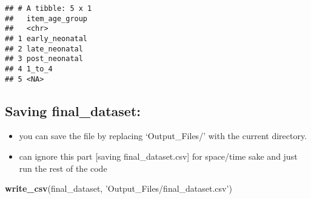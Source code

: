 \documentclass[]{article}
\newenvironment{Shaded}{\begin{snugshade}}{\end{snugshade}}
\newcommand{\DataTypeTok}[1]{\textcolor[rgb]{0.13,0.29,0.53}{#1}}
\newcommand{\DecValTok}[1]{\textcolor[rgb]{0.00,0.00,0.81}{#1}}
\newcommand{\KeywordTok}[1]{\textcolor[rgb]{0.13,0.29,0.53}{\textbf{#1}}}
\newcommand{\NormalTok}[1]{#1}
\newcommand{\OperatorTok}[1]{\textcolor[rgb]{0.81,0.36,0.00}{\textbf{#1}}}
\newcommand{\StringTok}[1]{\textcolor[rgb]{0.31,0.60,0.02}{#1}}
\providecommand{\tightlist}{%
  \setlength{\itemsep}{0pt}\setlength{\parskip}{0pt}}
\begin{document}
\begin{verbatim}
## # A tibble: 5 x 1
##   item_age_group
##   <chr>         
## 1 early_neonatal
## 2 late_neonatal 
## 3 post_neonatal 
## 4 1_to_4        
## 5 <NA>
\end{verbatim}

\begin{Shaded}
\end{Shaded}

\hypertarget{saving-final_dataset}{%
\subsection{Saving final\_dataset:}\label{saving-final_dataset}}

\begin{itemize}
\tightlist
\item
  you can save the file by replacing `Output\_Files/' with the current
  directory.
\item
  can ignore this part {[}saving final\_dataset.csv{]} for space/time
  sake and just run the rest of the code
\end{itemize}

\begin{Shaded}
\begin{Highlighting}[]
\KeywordTok{write_csv}\NormalTok{(final_dataset, }\StringTok{'Output_Files/final_dataset.csv'}\NormalTok{)}
\end{Highlighting}
\end{Shaded}
\end{document}
